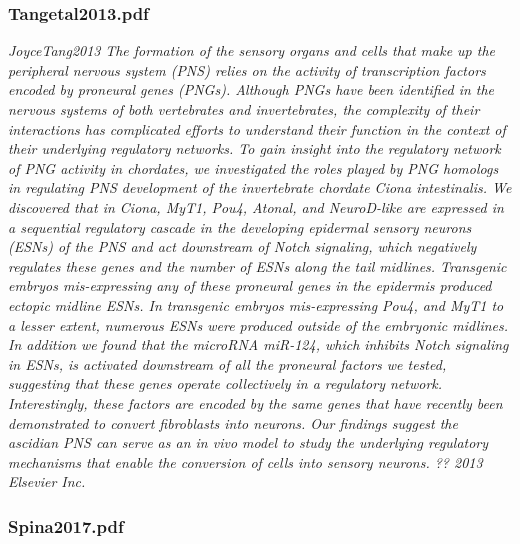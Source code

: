 \documentclass[graybox]{svmult}
\begin{document}
\subsubsection{Tangetal2013.pdf}
\textit{JoyceTang2013}
\textit{The formation of the sensory organs and cells that make up the peripheral nervous system (PNS) relies on the activity of transcription factors encoded by proneural genes (PNGs). Although PNGs have been identified in the nervous systems of both vertebrates and invertebrates, the complexity of their interactions has complicated efforts to understand their function in the context of their underlying regulatory networks. To gain insight into the regulatory network of PNG activity in chordates, we investigated the roles played by PNG homologs in regulating PNS development of the invertebrate chordate Ciona intestinalis. We discovered that in Ciona, MyT1, Pou4, Atonal, and NeuroD-like are expressed in a sequential regulatory cascade in the developing epidermal sensory neurons (ESNs) of the PNS and act downstream of Notch signaling, which negatively regulates these genes and the number of ESNs along the tail midlines. Transgenic embryos mis-expressing any of these proneural genes in the epidermis produced ectopic midline ESNs. In transgenic embryos mis-expressing Pou4, and MyT1 to a lesser extent, numerous ESNs were produced outside of the embryonic midlines. In addition we found that the microRNA miR-124, which inhibits Notch signaling in ESNs, is activated downstream of all the proneural factors we tested, suggesting that these genes operate collectively in a regulatory network. Interestingly, these factors are encoded by the same genes that have recently been demonstrated to convert fibroblasts into neurons. Our findings suggest the ascidian PNS can serve as an in vivo model to study the underlying regulatory mechanisms that enable the conversion of cells into sensory neurons. ?? 2013 Elsevier Inc.}

\subsubsection{Spina2017.pdf}
\end{document}
